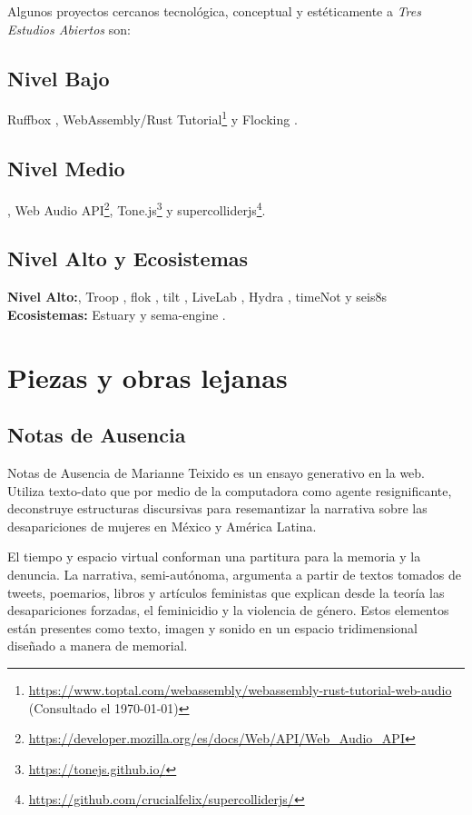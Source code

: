 Algunos proyectos cercanos tecnológica, conceptual y estéticamente a \emph{Tres Estudios Abiertos} son: 

\subsection{Nivel Bajo}

Ruffbox \citep{ruffbox}, WebAssembly/Rust Tutorial\footnote{\url{https://www.toptal.com/webassembly/webassembly-rust-tutorial-web-audio} (Consultado el \today)} y Flocking \citep{flocking}. 

\subsection{Nivel Medio}

\citep{supercolliderweb}, Web Audio API\footnote{\url{https://developer.mozilla.org/es/docs/Web/API/Web_Audio_API}}, Tone.js\footnote{\url{https://tonejs.github.io/}} y supercolliderjs\footnote{\url{https://github.com/crucialfelix/supercolliderjs/}}.

\subsection{Nivel Alto y Ecosistemas}

\textbf{Nivel Alto:}, Troop \citep{Troop}, flok \citep{flok}, tilt \citep{tilt}, LiveLab \citep{livelab}, Hydra \citep{hydra}, timeNot \citep{timenot} y seis8s \citep{seis8s}
\textbf{Ecosistemas:} Estuary \citep{estuary} y sema-engine \citep{sema}.  

\section{Piezas y obras lejanas}

\subsection{Notas de Ausencia} %

Notas de Ausencia de Marianne Teixido  es un ensayo generativo en la web. Utiliza texto-dato que por medio de la computadora como agente resignificante, deconstruye estructuras discursivas para resemantizar la narrativa sobre las desapariciones de mujeres en México y América Latina.

El tiempo y espacio virtual conforman una partitura para la memoria y la denuncia. La narrativa, semi-autónoma, argumenta a partir de textos tomados de tweets, poemarios, libros y artículos feministas que explican desde la teoría las desapariciones forzadas, el feminicidio y la violencia de género. Estos elementos están presentes como texto, imagen y sonido en un espacio tridimensional diseñado a manera de memorial.

